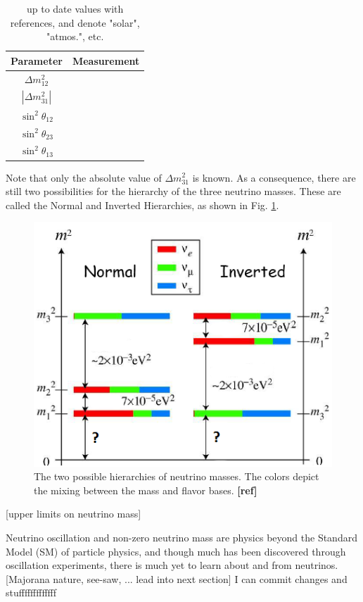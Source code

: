 \begin{table}[!htbp]
\caption{up to date values with references, and denote "solar", "atmos.", etc.} %
\label{table:nu_osc_vals}
\begin{tabular}{c|c}
Parameter & Measurement \\
\hline
$\Delta m_{12}^{2}$ & \\
$|\Delta m_{31}^{2}|$ & \\
$\sin^{2} \theta_{12}$ & \\
$\sin^{2} \theta_{23}$ & \\
$\sin^{2} \theta_{13}$ & \\
\end{tabular}
\end{table}

Note that only the absolute value of $\Delta m_{31}^{2}$ is known.  As a consequence, there are still two possibilities for the hierarchy of the three neutrino masses.  These are called the Normal and Inverted Hierarchies, as shown in Fig. \ref{fig:numasshier}.

\begin{figure}[H]
        \centering
                \includegraphics[width=.5\textwidth]{figures/hierarchy_alterred.png}
                \caption{The two possible hierarchies of neutrino masses.  The colors depict the mixing between the mass and flavor bases. {\color{red}\textbf{[ref]}}}
\label{fig:numasshier}
\end{figure}

[upper limits on neutrino mass]

Neutrino oscillation and non-zero neutrino mass are physics beyond the Standard Model (SM) of particle physics, and though much has been discovered through oscillation experiments, there is much yet to learn about and from neutrinos. [Majorana nature, see-saw, ... lead into next section]  I can commit changes and stufffffffffffff

